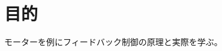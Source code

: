 \documentclass[../../../main]{subfiles}
\begin{document}
\section{目的}\label{sec:intro}
モーターを例にフィードバック制御の原理と実際を学ぶ。
\end{document}

